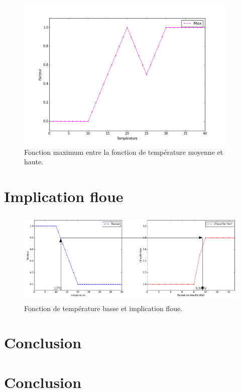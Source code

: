 \documentclass[a4paper,11pt]{article}
\begin{document}
\begin{figure}[H]
  \begin{center}
  \includegraphics[height=280px]{images/max.png}
  \caption{Fonction maximum entre la fonction de température moyenne et haute.}
  \end{center}
\end{figure}




\section{Implication floue}

\begin{figure}[H]
  \begin{center}
  \includegraphics[height=170px]{images/low_mamdani_arrow.png}
  \caption{Fonction de température basse et implication floue.}
  \end{center}
\end{figure}




\section*{Conclusion}

\newpage





\section*{Conclusion}
\end{document}
